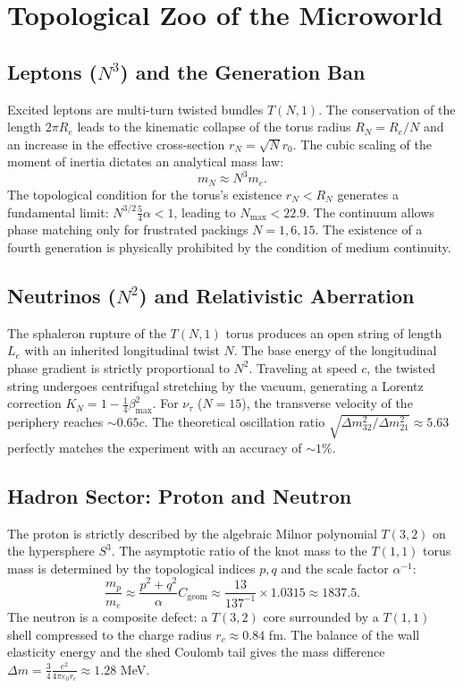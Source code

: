 \documentclass[12pt,a4paper]{article}
\begin{document}
\section{Topological Zoo of the Microworld}

\subsection{Leptons ($N^3$) and the Generation Ban}
Excited leptons are multi-turn twisted bundles $T(N,1)$. The conservation of the length $2\pi R_e$ leads to the kinematic collapse of the torus radius $R_N = R_e/N$ and an increase in the effective cross-section $r_N = \sqrt{N}r_0$. The cubic scaling of the moment of inertia dictates an analytical mass law:
\begin{equation}
m_N \approx N^3 m_e.
\end{equation}
The topological condition for the torus's existence $r_N < R_N$ generates a fundamental limit: $N^{3/2} \frac{5}{4}\alpha < 1$, leading to $N_{\text{max}} < 22.9$. The continuum allows phase matching only for frustrated packings $N=1, 6, 15$. The existence of a fourth generation is physically prohibited by the condition of medium continuity.

\subsection{Neutrinos ($N^2$) and Relativistic Aberration}
The sphaleron rupture of the $T(N,1)$ torus produces an open string of length $L_e$ with an inherited longitudinal twist $N$. The base energy of the longitudinal phase gradient is strictly proportional to $N^2$. Traveling at speed $c$, the twisted string undergoes centrifugal stretching by the vacuum, generating a Lorentz correction $K_N = 1 - \frac{1}{4}\beta_{\text{max}}^2$. For $\nu_\tau$ ($N=15$), the transverse velocity of the periphery reaches $\sim 0.65 c$. The theoretical oscillation ratio $\sqrt{\Delta m^2_{32} / \Delta m^2_{21}} \approx 5.63$ perfectly matches the experiment with an accuracy of $\sim 1\%$.

\subsection{Hadron Sector: Proton and Neutron}
The proton is strictly described by the algebraic Milnor polynomial $T(3,2)$ on the hypersphere $S^3$. The asymptotic ratio of the knot mass to the $T(1,1)$ torus mass is determined by the topological indices $p,q$ and the scale factor $\alpha^{-1}$:
\begin{equation}
\frac{m_p}{m_e} \approx \frac{p^2 + q^2}{\alpha} C_{\text{geom}} \approx \frac{13}{137^{-1}} \times 1.0315 \approx 1837.5.
\end{equation}
The neutron is a composite defect: a $T(3,2)$ core surrounded by a $T(1,1)$ shell compressed to the charge radius $r_c \approx 0.84$ fm. The balance of the wall elasticity energy and the shed Coulomb tail gives the mass difference $\Delta m = \frac{3}{4} \frac{e^2}{4\pi\varepsilon_0 r_c} \approx 1.28$ MeV.
\end{document}
